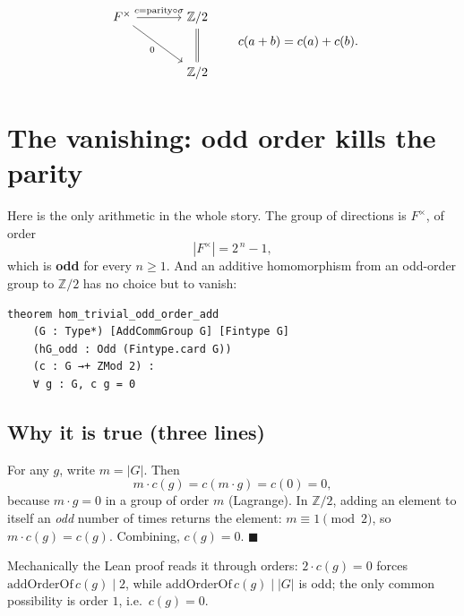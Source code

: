 \documentclass[11pt]{article}
\begin{document}

\[
\begin{tikzcd}[column sep=large, row sep=large]
F^\times \arrow[r, "c=\text{parity}\circ\sigma"] \arrow[dr, "0"'] & \mathbb{Z}/2 \\
& \mathbb{Z}/2 \arrow[u, equal]
\end{tikzcd}
\qquad
c(a+b)=c(a)+c(b).
\]

\bigskip

\section{The vanishing: odd order kills the parity}

\noindent
Here is the only arithmetic in the whole story. The group of directions is
$F^\times$, of order
\[
  |F^\times| = 2^{\,n}-1,
\]
which is \textbf{odd} for every $n\ge 1$. And an additive homomorphism from an
odd-order group to $\mathbb{Z}/2$ has no choice but to vanish:

\begin{lstlisting}
theorem hom_trivial_odd_order_add
    (G : Type*) [AddCommGroup G] [Fintype G]
    (hG_odd : Odd (Fintype.card G))
    (c : G →+ ZMod 2) :
    ∀ g : G, c g = 0
\end{lstlisting}

\subsection*{Why it is true (three lines)}

\noindent
For any $g$, write $m=|G|$. Then
\[
  m\cdot c(g) = c(m\cdot g) = c(0) = 0,
\]
because $m\cdot g=0$ in a group of order $m$ (Lagrange). In $\mathbb{Z}/2$,
adding an element to itself an \emph{odd} number of times returns the element:
$m\equiv 1 \pmod 2$, so $m\cdot c(g)=c(g)$. Combining, $c(g)=0$. \hfill$\blacksquare$

\medskip
\noindent
Mechanically the Lean proof reads it through orders: $2\cdot c(g)=0$ forces
$\mathrm{addOrderOf}\,c(g)\mid 2$, while $\mathrm{addOrderOf}\,c(g)\mid|G|$ is
odd; the only common possibility is order $1$, i.e.\ $c(g)=0$.
\end{document}

